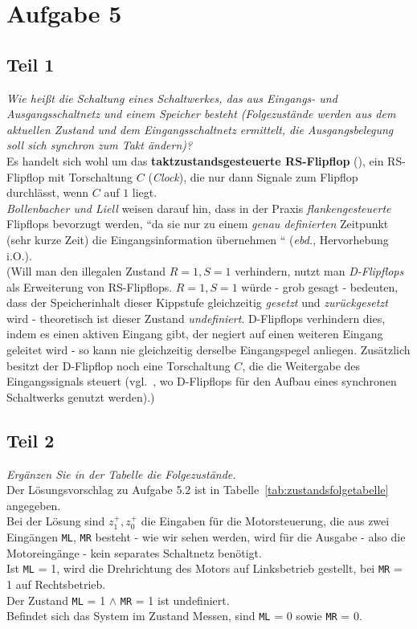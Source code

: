 \chapter{Aufgabe 5}

\section{Teil 1}


\textit{Wie heißt die Schaltung eines Schaltwerkes, das aus Eingangs- und
Ausgangsschaltnetz und einem Speicher besteht (Folgezustände werden
aus dem aktuellen Zustand und dem Eingangsschaltnetz ermittelt, die
Ausgangsbelegung soll sich synchron zum Takt ändern)?}\\

\noindent
Es handelt sich wohl um das \textbf{taktzustandsgesteuerte RS-Flipflop} (\cite[65 f.]{ES1}), ein RS-Flipflop mit Torschaltung $C$ (\textit{Clock}), die nur dann Signale zum Flipflop durchlässt, wenn $C$ auf $1$ liegt.\\
\textit{Bollenbacher und Liell} weisen darauf hin, dass in der Praxis \textit{flankengesteuerte} Flipflops bevorzugt werden,  ``da sie nur zu einem \textit{genau definierten} Zeitpunkt (sehr kurze Zeit) die Eingangsinformation übernehmen `` (\textit{ebd.}, Hervorhebung i.O.).\\

\noindent
(Will man den illegalen Zustand $R=1, S=1$ verhindern, nutzt man \textit{D-Flipflops} als Erweiterung von RS-Flipflops. $R=1, S=1$ würde - grob gesagt - bedeuten, dass der Speicherinhalt dieser Kippstufe gleichzeitig \textit{gesetzt} und \textit{zurückgesetzt} wird - theoretisch ist dieser Zustand \textit{undefiniert}.
D-Flipflops verhindern dies, indem es einen aktiven Eingang gibt, der negiert auf einen weiteren Eingang geleitet wird - so kann nie gleichzeitig derselbe Eingangspegel anliegen.
Zusätzlich besitzt der D-Flipflop noch eine Torschaltung $C$, die die Weitergabe des Eingangssignals steuert (vgl.~\cite[69]{ES1}, wo D-Flipflops für den Aufbau eines synchronen Schaltwerks genutzt werden).)

\section{Teil 2}

\textit{Ergänzen Sie in der Tabelle die Folgezustände.}\\

\noindent
Der Lösungsvorschlag zu Aufgabe 5.2 ist in Tabelle~\ref{tab:zustandsfolgetabelle} angegeben.\\
Bei der Lösung sind $z_1^+, z_0^+$ die Eingaben für die Motorsteuerung, die aus zwei Eingängen \texttt{ML}, \texttt{MR} besteht - wie wir sehen werden, wird für die Ausgabe - also die Motoreingänge - kein separates Schaltnetz benötigt.\\
Ist \texttt{ML} = 1, wird die Drehrichtung des Motors auf Linksbetrieb gestellt, bei \texttt{MR} = 1 auf Rechtsbetrieb.\\
Der Zustand \texttt{ML} = 1 $\land$ \texttt{MR} = 1 ist undefiniert.\\
Befindet sich das System im Zustand Messen, sind \texttt{ML} = 0 sowie \texttt{MR} = 0.

